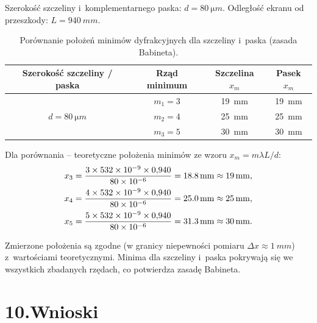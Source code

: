 \documentclass[a4paper,12pt]{article}
\begin{document}
Szerokość szczeliny i~komplementarnego paska: $d = \SI{80}{\micro m}$.
Odległość ekranu od przeszkody: $L = \SI{940}{mm}$.

\begin{table}[H]
\centering
\caption{Porównanie położeń minimów dyfrakcyjnych dla szczeliny i~paska
         (zasada Babineta).}
\label{tab:babinet}
\renewcommand{\arraystretch}{1.3}
\begin{tabular}{cccc}
\toprule
Szerokość szczeliny / paska &
  Rząd minimum &
  Szczelina $x_m$ &
  Pasek $x_m$ \\
\midrule
\multirow{3}{*}{$d = \SI{80}{\micro m}$}
  & $m_1 = 3$ & \SI{19}{mm} & \SI{19}{mm} \\
  & $m_2 = 4$ & \SI{25}{mm} & \SI{25}{mm} \\
  & $m_3 = 5$ & \SI{30}{mm} & \SI{30}{mm} \\
\bottomrule
\end{tabular}
\end{table}

\noindent Dla porównania -- teoretyczne położenia minimów ze wzoru $x_m = m\lambda L/d$:
\begin{align*}
  x_3 &= \frac{3 \times 532 \times 10^{-9} \times 0{,}940}{80 \times 10^{-6}}
       = \SI{18{,}8}{mm} \approx \SI{19}{mm}, \\
  x_4 &= \frac{4 \times 532 \times 10^{-9} \times 0{,}940}{80 \times 10^{-6}}
       = \SI{25{,}0}{mm} \approx \SI{25}{mm}, \\
  x_5 &= \frac{5 \times 532 \times 10^{-9} \times 0{,}940}{80 \times 10^{-6}}
       = \SI{31{,}3}{mm} \approx \SI{30}{mm}.
\end{align*}

\noindent Zmierzone położenia są zgodne (w granicy niepewności pomiaru
$\Delta x \approx \SI{1}{mm}$) z~wartościami teoretycznymi. Minima dla
szczeliny i~paska pokrywają się we wszystkich zbadanych rzędach,
co potwierdza zasadę Babineta.

\section*{10.\quad Wnioski}
\end{document}
